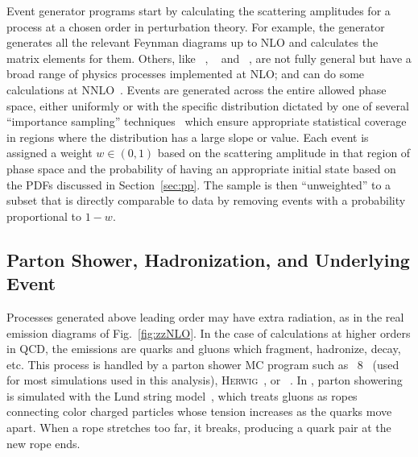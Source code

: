 Event generator programs start by calculating the scattering amplitudes for a process at a chosen order in perturbation theory.
For example, the generator {\MGAMC}~\cite{Alwall:2014hca} generates all the relevant Feynman diagrams up to NLO and calculates the matrix elements for them.
Others, like {\POWHEG}~\cite{Nason:2004rx,Frixione:2007vw,Alioli:2010xd}, {\SHERPA}~\cite{Gleisberg:2008ta} and {\MCFM}~\cite{Campbell:1999ah,Campbell:2011bn,Campbell:2015qma}, are not fully general but have a broad range of physics processes implemented at NLO\@; {\SHERPA} and {\MCFM} can do some calculations at NNLO~\cite{Boughezal:2016wmq}.
Events are generated across the entire allowed phase space, either uniformly or with the specific distribution dictated by one of several ``importance sampling'' techniques~\cite{Lepage:1977sw,Olive:2016xmw} which ensure appropriate statistical coverage in regions where the distribution has a large slope or value.
Each event is assigned a weight $w \in (0,1)$ based on the scattering amplitude in that region of phase space and the probability of having an appropriate initial state based on the PDFs discussed in Section~\ref{sec:pp}.
The sample is then ``unweighted'' to a subset that is directly comparable to data by removing events with a probability proportional to $1 - w$.


\subsection{Parton Shower, Hadronization, and Underlying Event}\label{sec:partonShower}

Processes generated above leading order may have extra radiation, as in the real emission diagrams of Fig.~\ref{fig:zzNLO}.
In the case of calculations at higher orders in QCD, the emissions are quarks and gluons which fragment, hadronize, decay, etc.
This process is handled by a parton shower MC program such as {\PYTHIA}~8~\cite{Sjostrand:2014zea} (used for most simulations used in this analysis), \textsc{Herwig}~\cite{Bahr:2008pv,Bellm:2015jjp}, or {\SHERPA}~\cite{Gleisberg:2008ta}.
In {\PYTHIA}, parton showering is simulated with the Lund string model~\cite{Andersson:1978vj,Andersson:1983jt, Andersson:2001yu,Olive:2016xmw}, which treats gluons as ropes connecting color charged particles whose tension increases as the quarks move apart.
When a rope stretches too far, it breaks, producing a quark pair at the new rope ends.

